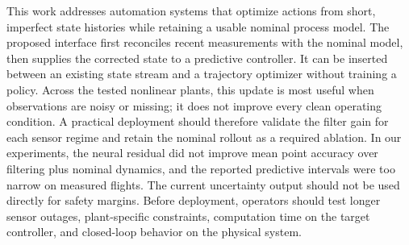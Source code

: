 This work addresses automation systems that optimize actions from short,
imperfect state histories while retaining a usable nominal process model.
The proposed interface first reconciles recent measurements with the nominal
model, then supplies the corrected state to a predictive controller. It can be
inserted between an existing state stream and a trajectory optimizer without
training a policy. Across the tested nonlinear plants, this update is most
useful when observations are noisy or missing; it does not improve every clean
operating condition. A practical deployment should therefore validate the
filter gain for each sensor regime and retain the nominal rollout as a required
ablation. In our experiments, the neural residual did not improve mean point
accuracy over filtering plus nominal dynamics, and the reported predictive
intervals were too narrow on measured flights. The current uncertainty output
should not be used directly for safety margins. Before deployment, operators
should test longer sensor outages, plant-specific constraints, computation
time on the target controller, and closed-loop behavior on the physical
system.
